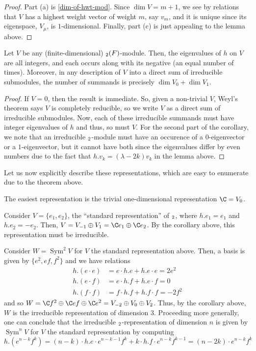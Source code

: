 \documentclass[11pt,leqno,oneside]{amsart}
\numberwithin{thm}{section}
\begin{document}
\begin{proof}
  Part (a) is \ref{dim-of-hwt-mod}. Since \(\dim V = m+1\), we see by
  relations that \(V\) has a highest weight vector of weight \(m\),
  say \(v_m\), and it is unique since its eigenspace, \(V_\mu\), is
  \(1\)-dimensional. Finally, part (c) is just appealing to the lemma above.
  \end{proof}
\begin{cor}
  Let \(V\) be any (finite-dimensional) \(\sl_2(F)\)-module. Then, the
  eigenvalues of \(h\) on \(V\) are all integers, and each occurs
  along with its negative (an equal number of times). Moreover, in any
  description of \(V\) into a direct sum of irreducible submodules,
  the number of summands is precisely \(\dim V_0 + \dim V_1\).
\end{cor}
\begin{proof}
  If \(V = 0\), then the result is immediate. So, given a non-trivial
  \(V\),  Weyl's theorem says \(V\) is completely reducible, so we
  write \(V\) as a direct sum of irreducible submodules. Now, each of
  these irreducible summands must have integer eigenvalues of
  \(h\) and thus, so must \(V\). For the second part of the corollary,
  we note that an irreducible \(\sl_2\)-module must have an occurence
  of a \(0\)-eigenvector or a \(1\)-eigenvector, but it cannot have
  both since the eigenvalues differ by even numbers due to the fact
  that \(h.v_k = (\lambda-2k)v_k\) in the lemma above.
\end{proof}
Let us now explicitly describe these representations, which are easy
to enumerate due to the theorem above.
\begin{example}
  The easiest representation is the trivial one-dimensional
  representation \(\C = V_0\). 
\end{example}
\begin{example}
  Consider \(V = \{e_1,e_2\}\), the ``standard representation'' of
  \(\sl_2\), where \(h.e_1 = e_1\) and \(h.e_2 = -e_2\). Then, \(V = V_{-1}
  \oplus V_1 = \C e_1 \oplus \C e_2\). By the corollary above, this
  representation must be irreducible.
\end{example}
\begin{example}
  Consider \(W = \operatorname{Sym}^2 V\) for \(V\) the standard
  representation above. Then, a basis is given by \(\{e^2, ef,
  f^2\}\) and we have relations
  \begin{align*}
    h.(e \cdot e) & = e \cdot h.e + h.e \cdot e = 2e^2 \\
    h.(e \cdot f) & = e \cdot h.f + h.e \cdot f = 0 \\
    h.(f \cdot f) & = f \cdot h.f + h.f \cdot f = -2 f^2
  \end{align*}
  and so \(W = \C f^2 \oplus \C ef \oplus \C e^2 = V_{-2} \oplus V_0
  \oplus V_2\). Thus, by the corollary above, \(W\) is the irreducible
  representation of dimension 3. Proceeding more generally, one can
  conclude that the irreducible \(\sl_2\)-representation of dimension
  \(n\) is given by \(\operatorname{Sym}^n V\) for \(V\) the standard
  representation by computing \[
    h.(e^{n-k}f^k) = (n-k)\cdot h.e \cdot e^{n-k-1}f^k + k \cdot h.f
    \cdot e^{n-k}f^{k-1} = (n-2k)\cdot e^{n-k} f^k
  \]
\end{example}
\end{document}
